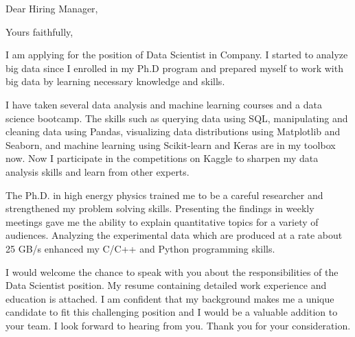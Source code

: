 \documentclass[12pt,letterpaper]{moderncv}   %
\newcommand{\CompanyName}{Company}
\newcommand{\CompanyAddress}{City, State}
\newcommand{\JobPositionName}{Data Scientist}
\newcommand{\ManagerName}{Hiring Manager,}
\newcommand{\ClosingWords}{Yours faithfully,} %
\begin{document}
%
%

\recipient{\CompanyName{}}{\CompanyAddress{}}
\date{\today}
\opening{Dear \ManagerName{}}
\closing{\ClosingWords}
\makelettertitle

%
%
\justifying

I am applying for the position of \JobPositionName{} in \CompanyName{}.
I started to analyze big data since I enrolled in my Ph.D program and prepared myself to work with big data by learning necessary knowledge and skills.

I have taken several data analysis and machine learning courses and a data science bootcamp.
The skills such as querying data using SQL, manipulating and cleaning data using Pandas, visualizing data distributions using Matplotlib and Seaborn, and machine learning using Scikit-learn and Keras are in my toolbox now.
Now I participate in the competitions on Kaggle to sharpen my data analysis skills and learn from other experts.

The Ph.D. in high energy physics trained me to be a careful researcher and strengthened my problem solving skills.
Presenting the findings in weekly meetings gave me the ability to explain quantitative topics for a variety of audiences.
Analyzing the experimental data which are produced at a rate about 25 GB/s enhanced my C/C++ and Python programming skills.

I would welcome the chance to speak with you about the responsibilities of the \JobPositionName{} position.
My resume containing detailed work experience and education is attached.
I am confident that my background makes me a unique candidate to fit this challenging position and I would be a valuable addition to your team.
I look forward to hearing from you.
Thank you for your consideration.

\vspace{0.5cm}

\makeletterclosing
\end{document}
